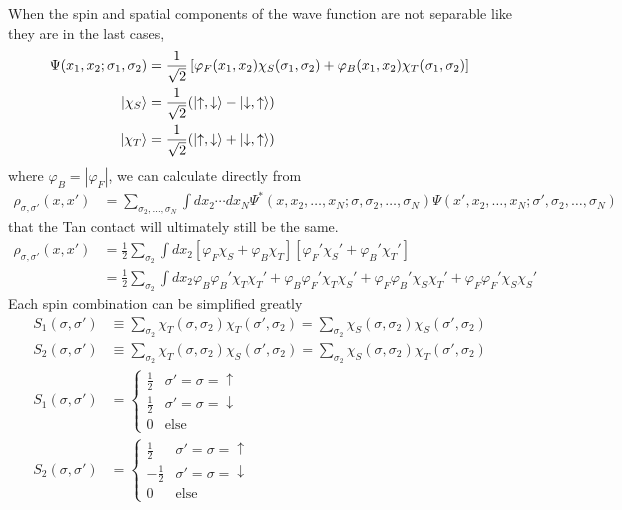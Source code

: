 \documentclass[onecolumn,english,aps,pra]{revtex4}
\begin{document}
When the spin and spatial components of the wave function are not separable like they are in the last cases,
\begin{align}
\Psi(x_1, x_2; \sigma_1, \sigma_2) &= \frac{1}{\sqrt{2}}\left[\varphi_F(x_1, x_2) \chi_S(\sigma_1, \sigma_2) + \varphi_B(x_1,x_2) \chi_T(\sigma_1, \sigma_2)\right]
\label{MixedState}\\
\ket{\chi_S}& = \frac{1}{\sqrt{2}}(\ket{\uparrow, \downarrow} - \ket{\downarrow, \uparrow})\nonumber\\
\ket{\chi_T} &= \frac{1}{\sqrt{2}}(\ket{\uparrow, \downarrow} + \ket{\downarrow, \uparrow})\nonumber
\end{align}
where $\varphi_B = |\varphi_F|$, we can calculate directly from 
%
\begin{align*}
\rho_{\sigma, \sigma'}(x, x')& = 
\sum_{\sigma_2, \ldots, \sigma_N} \int dx_2 \cdots dx_N
\Psi^*(x,x_2,\ldots,x_N;\sigma, \sigma_2,\ldots,\sigma_N)
\Psi(x',x_2,\ldots,x_N;\sigma', \sigma_2,\ldots,\sigma_N)
\end{align*}
%
that the Tan contact will ultimately still be the same. 
%
\begin{align}
\rho_{\sigma, \sigma'}(x, x') &= \frac{1}{2}\sum_{\sigma_2} \int dx_2 
\left[ \varphi_F \chi_S + \varphi_B \chi_T\right]
\left[ \varphi_F' \chi_S' + \varphi_B' \chi_T'\right]\nonumber\\
& = \frac{1}{2}\sum_{\sigma_2} \int dx_2 
\varphi_B\varphi_B'\chi_T\chi_T'
+ \varphi_B\varphi_F'\chi_T\chi_S'
+ \varphi_F\varphi_B'\chi_S\chi_T'
+ \varphi_F\varphi_F'\chi_S\chi_S'
\label{MixedOBDMSimp}
\end{align}
%
Each spin combination can be simplified greatly
\begin{align*}
S_{1}(\sigma, \sigma') &\equiv \sum_{\sigma_2}\chi_T(\sigma,\sigma_2)\chi_T(\sigma',\sigma_2) 
= \sum_{\sigma_2}\chi_S(\sigma,\sigma_2)\chi_S(\sigma',\sigma_2)\\
S_{2}(\sigma, \sigma') &\equiv \sum_{\sigma_2}\chi_T(\sigma,\sigma_2)\chi_S(\sigma',\sigma_2) 
= \sum_{\sigma_2}\chi_S(\sigma,\sigma_2)\chi_T(\sigma',\sigma_2)\\
S_{1}(\sigma, \sigma') & =
\begin{cases}
	\frac{1}{2} & \sigma' = \sigma = \uparrow\\
	\frac{1}{2} & \sigma' = \sigma = \downarrow \\
	0 & \text{else}
\end{cases}\\
S_{2}(\sigma, \sigma') & =
\begin{cases}
	\frac{1}{2} & \sigma' = \sigma = \uparrow\\
	-\frac{1}{2} & \sigma' = \sigma = \downarrow \\
	0 & \text{else}
\end{cases}
\end{align*}
\end{document}
